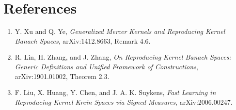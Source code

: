\documentclass[11pt]{article}
\begin{document}
\section*{References}

\begin{enumerate}
\item Y. Xu and Q. Ye, \emph{Generalized Mercer Kernels and Reproducing
Kernel Banach Spaces}, arXiv:1412.8663, Remark 4.6.
\item R. Lin, H. Zhang, and J. Zhang, \emph{On Reproducing Kernel Banach
Spaces: Generic Definitions and Unified Framework of Constructions},
arXiv:1901.01002, Theorem 2.3.
\item F. Liu, X. Huang, Y. Chen, and J. A. K. Suykens, \emph{Fast Learning
in Reproducing Kernel Krein Spaces via Signed Measures}, arXiv:2006.00247.
\end{enumerate}
\end{document}
